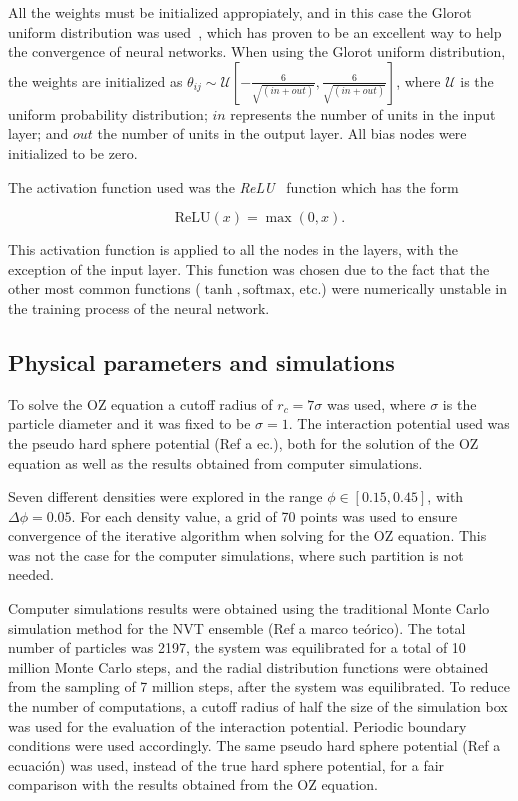 All the weights must be initialized appropiately, and in this case the Glorot uniform
distribution was used~\cite{glorotUnderstandingDifficultyTraining2010}, which has proven
to be an excellent way to help the convergence of neural networks.
When using the Glorot uniform distribution, the weights are initialized as
$
\theta_{ij} \sim \mathcal{U} \left[ -\frac{6}{\sqrt{(in + out)}},
\frac{6}{\sqrt{(in + out)}} \right]
$,
where $\mathcal{U}$ is the uniform probability distribution;
$in$ represents the number of units in the input layer; and $out$ the number of
units in the output layer. All bias nodes were initialized to be zero.

The activation function used was the \emph{ReLU}~\cite{glorotDeepSparseRectifier2011}
function which has the form

\begin{equation*}
    \text{ReLU}(x) = \max{(0, x)} .
\end{equation*}

This activation function is applied to all the nodes in the layers, with the exception
of the input layer. This function was chosen due to the fact that the other most common
functions ($\tanh, \text{softmax}$, etc.) were numerically unstable in the training process 
of the neural network.

\subsection{Physical parameters and simulations}

To solve the OZ equation a cutoff radius of $r_c=7\sigma$ was used, where $\sigma$ is the
particle diameter and it was fixed to be $\sigma=1$.
The interaction potential used was the pseudo hard sphere potential (Ref a ec.), both
for the solution of the OZ equation as well as the results obtained from computer simulations.

Seven different densities were explored in the range $\phi \in [\num{0.15}, \num{0.45}]$, 
with $\Delta \phi = \num{0.05}$.
For each density value, a grid of 70 points was used to ensure convergence of the iterative
algorithm when solving for the OZ equation. This was not the case for the computer 
simulations, where such partition is not needed.

Computer simulations results were obtained using the traditional Monte Carlo simulation
method for the NVT ensemble (Ref a marco teórico). The total number of particles was 2197,
the system was equilibrated for a total of 10 million Monte Carlo steps, and the radial
distribution functions were obtained from the sampling of 7 million steps, after
the system was equilibrated. To reduce the number of computations, a cutoff radius of
half the size of the simulation box was used for the evaluation of the interaction 
potential. Periodic boundary conditions were used accordingly. The same pseudo hard 
sphere potential (Ref a ecuación) was used, instead of the true hard sphere potential, for 
a fair comparison with the results obtained from the OZ equation.

